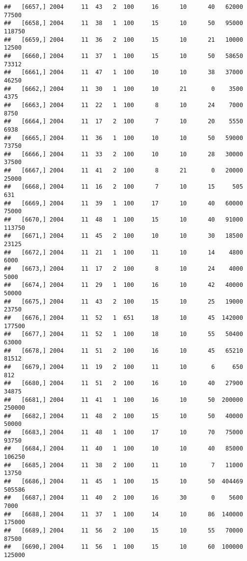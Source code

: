 \documentclass{article}\usepackage[]{graphicx}\usepackage[]{color}
\makeatletter
\newenvironment{kframe}{%
 \def\at@end@of@kframe{}%
 \ifinner\ifhmode%
  \def\at@end@of@kframe{\end{minipage}}%
  \begin{minipage}{\columnwidth}%
 \fi\fi%
 \def\FrameCommand##1{\hskip\@totalleftmargin \hskip-\fboxsep
 \colorbox{shadecolor}{##1}\hskip-\fboxsep
     \hskip-\linewidth \hskip-\@totalleftmargin \hskip\columnwidth}%
 \MakeFramed {\advance\hsize-\width
   \@totalleftmargin\z@ \linewidth\hsize
   \@setminipage}}%
 {\par\unskip\endMakeFramed%
 \at@end@of@kframe}
\newenvironment{knitrout}{}{} %
\makeatother
\begin{document}
\begin{knitrout}
\begin{kframe}
\begin{verbatim}
##   [6657,] 2004     11  43   2  100     16      10      40   62000   77500
##   [6658,] 2004     11  38   1  100     15      10      50   95000  118750
##   [6659,] 2004     11  36   2  100     15      10      21   10000   12500
##   [6660,] 2004     11  37   1  100     15      10      50   58650   73312
##   [6661,] 2004     11  47   1  100     10      10      38   37000   46250
##   [6662,] 2004     11  30   1  100     10      21       0    3500    4375
##   [6663,] 2004     11  22   1  100      8      10      24    7000    8750
##   [6664,] 2004     11  17   2  100      7      10      20    5550    6938
##   [6665,] 2004     11  36   1  100     10      10      50   59000   73750
##   [6666,] 2004     11  33   2  100     10      10      28   30000   37500
##   [6667,] 2004     11  41   2  100      8      21       0   20000   25000
##   [6668,] 2004     11  16   2  100      7      10      15     505     631
##   [6669,] 2004     11  39   1  100     17      10      40   60000   75000
##   [6670,] 2004     11  48   1  100     15      10      40   91000  113750
##   [6671,] 2004     11  45   2  100     10      10      30   18500   23125
##   [6672,] 2004     11  21   1  100     11      10      14    4800    6000
##   [6673,] 2004     11  17   2  100      8      10      24    4000    5000
##   [6674,] 2004     11  29   1  100     16      10      42   40000   50000
##   [6675,] 2004     11  43   2  100     15      10      25   19000   23750
##   [6676,] 2004     11  52   1  651     18      10      45  142000  177500
##   [6677,] 2004     11  52   1  100     18      10      55   50400   63000
##   [6678,] 2004     11  51   2  100     16      10      45   65210   81512
##   [6679,] 2004     11  19   2  100     11      10       6     650     812
##   [6680,] 2004     11  51   2  100     16      10      40   27900   34875
##   [6681,] 2004     11  41   1  100     16      10      50  200000  250000
##   [6682,] 2004     11  48   2  100     15      10      50   40000   50000
##   [6683,] 2004     11  48   1  100     17      10      70   75000   93750
##   [6684,] 2004     11  40   1  100     10      10      40   85000  106250
##   [6685,] 2004     11  38   2  100     11      10       7   11000   13750
##   [6686,] 2004     11  45   1  100     15      10      50  404469  505586
##   [6687,] 2004     11  40   2  100     16      30       0    5600    7000
##   [6688,] 2004     11  37   1  100     14      10      86  140000  175000
##   [6689,] 2004     11  56   2  100     15      10      55   70000   87500
##   [6690,] 2004     11  56   1  100     15      10      60  100000  125000

\end{verbatim}
\end{kframe}
\end{knitrout}
\end{document}
